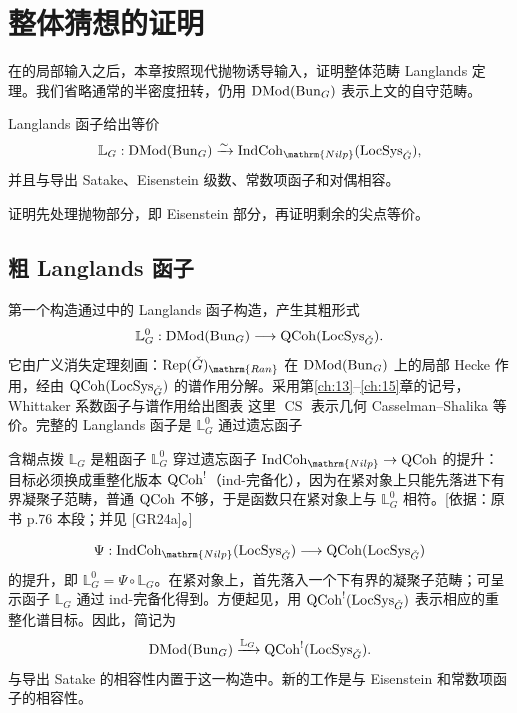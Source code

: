 \chapter{整体猜想的证明}\label{ch:16}
在的局部输入之后，本章按照现代抛物诱导输入\cite{CCF24}，证明整体范畴 Langlands 定理。我们省略通常的半密度扭转，仍用 $\operatorname{DMod}(\operatorname{Bun}_G)$ 表示上文的自守范畴。
\begin{theorem*}{}
Langlands 函子给出等价
\[\mathbb L_G:\DMod(\Bun_G)\xrightarrow{\sim}\IndCoh_{\mathrm{Nilp}}(\LocSys_{\checkG}),\]
并且与导出 Satake、Eisenstein 级数、常数项函子和对偶相容。
\end{theorem*}
证明先处理抛物部分，即 Eisenstein 部分，再证明剩余的尖点等价。

\section{粗 Langlands 函子}\label{sec:16.1}
第一个构造通过\cite{GR24a}中的 Langlands 函子构造，产生其粗形式
\[\mathbb L_G^0:\operatorname{DMod}(\operatorname{Bun}_G)\longrightarrow\operatorname{QCoh}(\operatorname{LocSys}_{\check{G}}).\]
它由广义消失定理刻画：$\Rep(\checkG)_{\mathrm{Ran}}$ 在 $\operatorname{DMod}(\operatorname{Bun}_G)$ 上的局部 Hecke 作用，经由 $\operatorname{QCoh}(\operatorname{LocSys}_{\check{G}})$ 的谱作用分解。采用第\ref{ch:13}–\ref{ch:15}章的记号，Whittaker 系数函子与谱作用给出图表
这里 $\operatorname{CS}$ 表示几何 Casselman–Shalika 等价。完整的 Langlands 函子是 $\mathbb L_G^0$ 通过遗忘函子

\begin{transnote}{含糊点拨}
$\mathbb L_G$ 是粗函子 $\mathbb L_G^0$ 穿过遗忘函子 $\IndCoh_{\mathrm{Nilp}}\to\QCoh$ 的提升：目标必须换成重整化版本 $\operatorname{QCoh}^{!}$（ind-完备化），因为在紧对象上只能先落进下有界凝聚子范畴，普通 $\operatorname{QCoh}$ 不够，于是函数只在紧对象上与 $\mathbb L_G^0$ 相符。[依据：原书 p.76 本段；并见 [GR24a]。]
\end{transnote}
\[\Psi:\IndCoh_{\mathrm{Nilp}}(\LocSys_{\checkG})\longrightarrow\QCoh(\LocSys_{\checkG})\]
的提升，即 $\mathbb L_G^0=\Psi\circ\mathbb L_G$。在紧对象上，首先落入一个下有界的凝聚子范畴；可呈示函子 $\mathbb L_G$ 通过 ind-完备化得到。方便起见，用 $\operatorname{QCoh}^!(\operatorname{LocSys}_{\check{G}})$ 表示相应的重整化谱目标。因此，简记为
\[\operatorname{DMod}(\operatorname{Bun}_G)\xrightarrow{\mathbb L_G}\operatorname{QCoh}^!(\operatorname{LocSys}_{\check{G}}).\]
与导出 Satake 的相容性内置于这一构造中。新的工作是与 Eisenstein 和常数项函子的相容性\cite{CCF24}。

